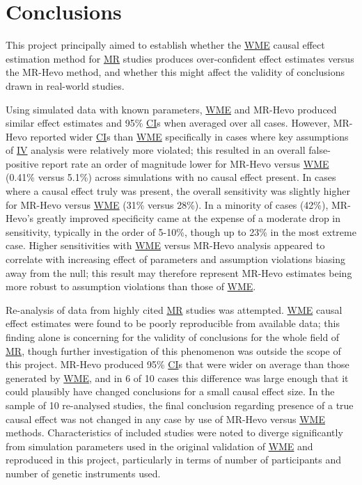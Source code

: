 \documentclass[
]{article}
\begin{document}
\newpage

\section{Conclusions}\label{conclusions-1}

This project principally aimed to establish whether the \hyperref[acronyms_WME]{WME} causal effect estimation method for \hyperref[acronyms_MR]{MR} studies produces over-confident effect estimates versus the MR-Hevo method, and whether this might affect the validity of conclusions drawn in real-world studies.

Using simulated data with known parameters, \hyperref[acronyms_WME]{WME} and MR-Hevo produced similar effect estimates and 95\% \hyperref[acronyms_CI]{CI}s when averaged over all cases. However, MR-Hevo reported wider \hyperref[acronyms_CI]{CI}s than \hyperref[acronyms_WME]{WME} specifically in cases where key assumptions of \hyperref[acronyms_IV]{IV} analysis were relatively more violated; this resulted in an overall false-positive report rate an order of magnitude lower for MR-Hevo versus \hyperref[acronyms_WME]{WME} (0.41\% versus 5.1\%) across simulations with no causal effect present. In cases where a causal effect truly was present, the overall sensitivity was slightly higher for MR-Hevo versus \hyperref[acronyms_WME]{WME} (31\% versus 28\%). In a minority of cases (42\%), MR-Hevo's greatly improved specificity came at the expense of a moderate drop in sensitivity, typically in the order of 5-10\%, though up to 23\% in the most extreme case. Higher sensitivities with \hyperref[acronyms_WME]{WME} versus MR-Hevo analysis appeared to correlate with increasing effect of parameters and assumption violations biasing away from the null; this result may therefore represent MR-Hevo estimates being more robust to assumption violations than those of \hyperref[acronyms_WME]{WME}.

Re-analysis of data from highly cited \hyperref[acronyms_MR]{MR} studies was attempted. \hyperref[acronyms_WME]{WME} causal effect estimates were found to be poorly reproducible from available data; this finding alone is concerning for the validity of conclusions for the whole field of \hyperref[acronyms_MR]{MR}, though further investigation of this phenomenon was outside the scope of this project. MR-Hevo produced 95\% \hyperref[acronyms_CI]{CI}s that were wider on average than those generated by \hyperref[acronyms_WME]{WME}, and in 6 of 10 cases this difference was large enough that it could plausibly have changed conclusions for a small causal effect size. In the sample of 10 re-analysed studies, the final conclusion regarding presence of a true causal effect was not changed in any case by use of MR-Hevo versus \hyperref[acronyms_WME]{WME} methods. Characteristics of included studies were noted to diverge significantly from simulation parameters used in the original validation of \hyperref[acronyms_WME]{WME} and reproduced in this project, particularly in terms of number of participants and number of genetic instruments used.
\end{document}
